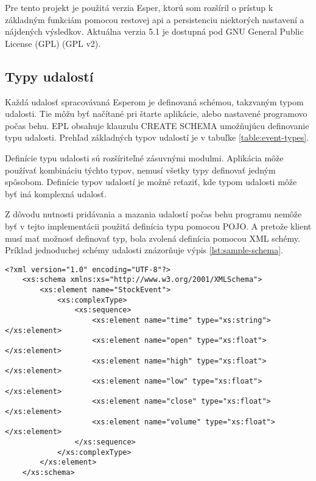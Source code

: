 	Pre tento projekt je použitá verzia Esper, ktorú som rozšíril o prístup k základným funkciám pomocou restovej api a persistenciu niektorých nastavení a nájdených výsledkov. Aktuálna verzia 5.1 je dostupná pod GNU General Public License (GPL) (GPL v2).

	\subsection{Typy udalostí}
	Každá udalosť spracovávaná Esperom je definovaná schémou, takzvaným typom udalosti. Tie môžu byť načítané pri štarte aplikácie, alebo nastavené programovo počas behu. EPL obsahuje klauzulu CREATE SCHEMA umožňujúcu definovanie typu udalosti. Prehľad základných typov udalostí je v tabuľke \ref{table:event-types}.

	
	Definície typu udalosti sú rozšíriteľné zásuvnými modulmi. Aplikácia môže používať kombináciu týchto typov, nemusí všetky typy definovať jedným spôsobom. Definície typov udalostí je možné reťaziť, kde typom udalosti môže byť iná komplexná udalosť.
	
	Z dôvodu nutnosti pridávania a mazania udalostí počas behu programu nemôže byť v tejto implementácii použitá definícia typu pomocou POJO. A pretože klient musí mať možnosť definovať typ, bola zvolená definícia pomocou XML schémy. Príklad jednoduchej schémy udalosti znázorňuje výpis \ref{lst:sample-schema}.
	
	\begin{lstlisting}[label=lst:sample-schema,caption=Príklad XML schémy udalosti]
	<?xml version="1.0" encoding="UTF-8"?>
	<xs:schema xmlns:xs="http://www.w3.org/2001/XMLSchema">
		<xs:element name="StockEvent">
			<xs:complexType>
				<xs:sequence>
			        <xs:element name="time" type="xs:string"></xs:element>
			        <xs:element name="open" type="xs:float"></xs:element>
			        <xs:element name="high" type="xs:float"></xs:element>
			        <xs:element name="low" type="xs:float"></xs:element>
			        <xs:element name="close" type="xs:float"></xs:element>
			        <xs:element name="volume" type="xs:float"></xs:element>
				</xs:sequence>
			</xs:complexType>
		</xs:element>
	</xs:schema>	
	\end{lstlisting}
	
